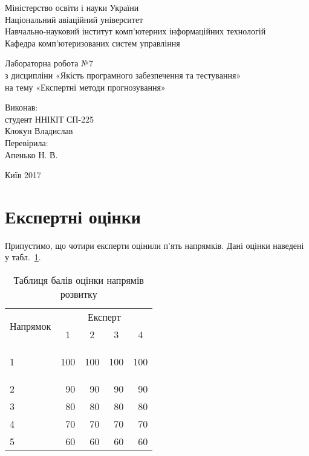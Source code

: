 \documentclass[a4paper,oneside,DIV=12,12pt]{scrartcl}
\begin{document}
	\begin{titlepage}
    \begin{center}
	Міністерство освіти і науки України\\
	Національний авіаційний університет\\
	Навчально-науковий інститут комп'ютерних інформаційних технологій\\
	Кафедра комп'ютеризованих систем управління

	\vspace{\fill}

	Лабораторна робота №7\\
	з дисципліни «Якість програмного забезпечення та тестування»\\
	на тему «Експертні методи прогнозування»

	\vspace{\fill}
	
	\begin{flushright}
		Виконав:\\
		студент ННІКІТ СП-225\\
		Клокун Владислав\\
		Перевірила:\\
		Апенько Н. В.
	\end{flushright}

	Київ 2017

    \end{center}
    \end{titlepage}
	
	\section{Експертні оцінки}
		Припустимо, що чотири експерти оцінили п'ять напрямків. Дані оцінки наведені у табл.~\ref{tab:direction-marks}.
		
		\begin{longtable}[c]{lrrrr}
			\toprule
				\multirow{2}{*}[-2pt]{Напрямок} & \multicolumn{4}{c}{Експерт} \\
				\cmidrule(lr){2-5}
				 & \multicolumn{1}{c}{1} & \multicolumn{1}{c}{2} & \multicolumn{1}{c}{3} & \multicolumn{1}{c}{4} \\
			\midrule
			\endhead
			\bottomrule
			\caption{Таблиця балів оцінки напрямів розвитку}
			\endfoot
			\label{tab:direction-marks}
			
				1 & 100 & 100 & 100 & 100\\
				2 & 90  & 90  & 90  & 90\\
				3 & 80  & 80  & 80  & 80\\
				4 & 70  & 70  & 70  & 70\\
				5 & 60  & 60  & 60  & 60\\
		\end{longtable}
		
\end{document}
